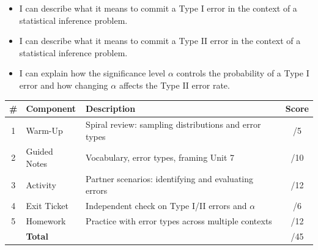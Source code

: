 \documentclass[10pt]{article}
\begin{document}

\vspace{2.4cm}
\namedateperiod

\begin{learningtargetbox}
\begin{itemize}
    \item I can describe what it means to commit a Type I error in the context of a
          statistical inference problem.
    \item I can describe what it means to commit a Type II error in the context of a
          statistical inference problem.
    \item I can explain how the significance level $\alpha$ controls the probability
          of a Type I error and how changing $\alpha$ affects the Type II error rate.
\end{itemize}
\end{learningtargetbox}

\begin{tocbox}
\renewcommand{\arraystretch}{1.5}
\begin{tabularx}{\linewidth}{clXc}
    \textbf{\#} & \textbf{Component} & \textbf{Description} & \textbf{Score} \\
    \hline
    1 & Warm-Up      & Spiral review: sampling distributions and error types & \hfill/5 \\
    2 & Guided Notes & Vocabulary, error types, framing Unit 7               & \hfill/10 \\
    3 & Activity     & Partner scenarios: identifying and evaluating errors   & \hfill/12 \\
    4 & Exit Ticket  & Independent check on Type I/II errors and $\alpha$     & \hfill/6 \\
    5 & Homework     & Practice with error types across multiple contexts     & \hfill/12 \\
    \hline
       & \multicolumn{2}{l}{\textbf{Total}} & \hfill/45 \\
\end{tabularx}
\end{tocbox}
\end{document}
